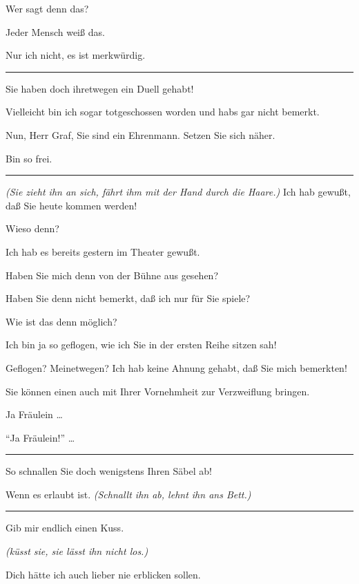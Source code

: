 \documentclass[
	final,
	a4paper,
	ngerman,
	mpinclude = true, %
	twoside = true,
	open = right,
	cleardoublepage = plain,
	DIV = 13,
	BCOR = 1cm,
	titlepage = firstiscover,
	]{scrbook}
\newcommand{\direction}[1]{\textit{(#1)}}
\newenvironment{deletion}{%
		\vspace{0.25\baselineskip}
		\hrule
		\vspace{0.25\baselineskip}
		\color{darkgray}
	}{
		\color{black}
		\vspace{0.25\baselineskip}
		\hrule 
		\vspace{0.25\baselineskip}
	}
\newcommand{\thecharacter}[1]{\textup{\textsc{#1}}\xspace}
\newcommand{\theschauspielerin}{\thecharacter{Schauspielerin}}
\newcommand{\thegraf}{\thecharacter{Entrepeneurin}}
\newcommand{\character}[1]{\item[#1:]}
\newcommand{\schauspielerin}{\character{\theschauspielerin}}
\newcommand{\entrepeneurin}{\character{\thegraf}}
\begin{document}
\begin{play}
	\entrepeneurin
	Wer sagt denn das?

	\schauspielerin
	Jeder Mensch weiß das.

	\entrepeneurin
	Nur ich nicht, es ist merkwürdig.

	\begin{deletion}
	\schauspielerin
	Sie haben doch ihretwegen ein Duell gehabt!

	\entrepeneurin
	Vielleicht bin ich sogar totgeschossen worden und habs gar nicht bemerkt.

	\schauspielerin
	Nun, Herr Graf, Sie sind ein Ehrenmann. Setzen Sie sich näher.

	\entrepeneurin
	Bin so frei.

	\end{deletion}
	\schauspielerin
	\direction{Sie zieht ihn an sich, fährt ihm mit der Hand durch die Haare.} Ich hab gewußt, daß Sie heute kommen werden!

	\entrepeneurin
	Wieso denn?

	\schauspielerin
	Ich hab es bereits gestern im Theater gewußt.

	\entrepeneurin
	Haben Sie mich denn von der Bühne aus gesehen?

	\schauspielerin
	Haben Sie denn nicht bemerkt, daß ich nur für Sie spiele?

	\entrepeneurin
	Wie ist das denn möglich?

	\schauspielerin
	Ich bin ja so geflogen, wie ich Sie in der ersten Reihe sitzen sah!

	\entrepeneurin
	Geflogen? Meinetwegen? Ich hab keine Ahnung gehabt, daß Sie mich bemerkten!

	\schauspielerin
	Sie können einen auch mit Ihrer Vornehmheit zur Verzweiflung bringen.

	\entrepeneurin
	Ja Fräulein \ldots{}

	\schauspielerin
	\enquote{Ja Fräulein!} \ldots{}
	\begin{deletion}
	So schnallen Sie doch wenigstens Ihren Säbel ab!

	\entrepeneurin
	Wenn es erlaubt ist. \direction{Schnallt ihn ab, lehnt ihn ans Bett.}

	\end{deletion}
	\schauspielerin
	Gib mir endlich einen Kuss.

	\entrepeneurin
	\direction{küsst sie, sie lässt ihn nicht los.}

	\schauspielerin
	Dich hätte ich auch lieber nie erblicken sollen.


\end{play}
\end{document}
